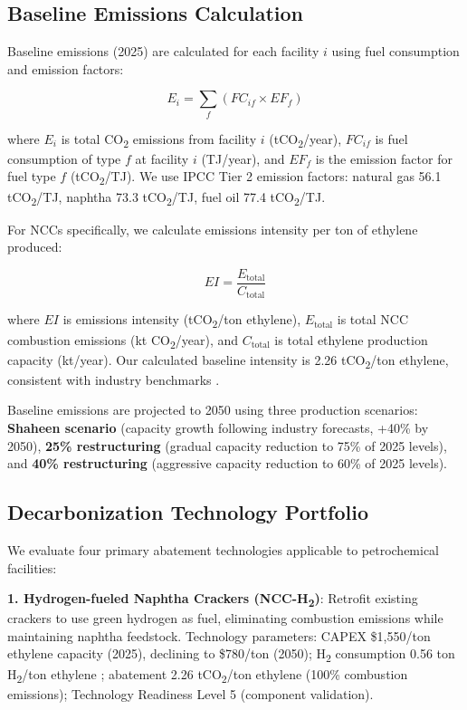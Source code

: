 \documentclass[11pt,a4paper]{article}
\begin{document}
\subsection{Baseline Emissions Calculation}

Baseline emissions (2025) are calculated for each facility $i$ using fuel consumption and emission factors:

\begin{equation}
E_i = \sum_f (FC_{if} \times EF_f)
\label{eq:baseline}
\end{equation}

\noindent where $E_i$ is total CO\textsubscript{2} emissions from facility $i$ (tCO\textsubscript{2}/year), $FC_{if}$ is fuel consumption of type $f$ at facility $i$ (TJ/year), and $EF_f$ is the emission factor for fuel type $f$ (tCO\textsubscript{2}/TJ). We use IPCC Tier 2 emission factors: natural gas 56.1 tCO\textsubscript{2}/TJ, naphtha 73.3 tCO\textsubscript{2}/TJ, fuel oil 77.4 tCO\textsubscript{2}/TJ.

For NCCs specifically, we calculate emissions intensity per ton of ethylene produced:

\begin{equation}
EI = \frac{E_{\text{total}}}{C_{\text{total}}}
\label{eq:intensity}
\end{equation}

\noindent where $EI$ is emissions intensity (tCO\textsubscript{2}/ton ethylene), $E_{\text{total}}$ is total NCC combustion emissions (kt CO\textsubscript{2}/year), and $C_{\text{total}}$ is total ethylene production capacity (kt/year). Our calculated baseline intensity is 2.26 tCO\textsubscript{2}/ton ethylene, consistent with industry benchmarks \citep{GESI2024}.

Baseline emissions are projected to 2050 using three production scenarios: \textbf{Shaheen scenario} (capacity growth following industry forecasts, +40\% by 2050), \textbf{25\% restructuring} (gradual capacity reduction to 75\% of 2025 levels), and \textbf{40\% restructuring} (aggressive capacity reduction to 60\% of 2025 levels).

\subsection{Decarbonization Technology Portfolio}
\label{sec:tech_portfolio}

We evaluate four primary abatement technologies applicable to petrochemical facilities:

\textbf{1. Hydrogen-fueled Naphtha Crackers (NCC-H\textsubscript{2})}: Retrofit existing crackers to use green hydrogen as fuel, eliminating combustion emissions while maintaining naphtha feedstock. Technology parameters: CAPEX \$1,550/ton ethylene capacity (2025), declining to \$780/ton (2050); H\textsubscript{2} consumption 0.56 ton H\textsubscript{2}/ton ethylene \citep{Chen2024,Gupta2023,Park2022,IEAHydrogen2022}; abatement 2.26 tCO\textsubscript{2}/ton ethylene (100\% combustion emissions); Technology Readiness Level 5 (component validation).
\end{document}
